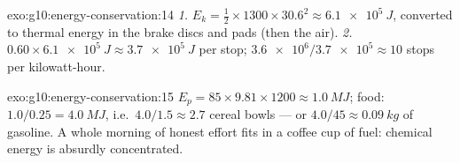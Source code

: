 \begin{solution}{exo:g10:energy-conservation:14}
\emph{1.} $E_k = \tfrac12 \times 1300 \times 30.6^2 \approx
\qty{6.1e5}{J}$, converted to thermal energy in the brake discs
and pads (then the air).
\emph{2.} $0.60 \times \qty{6.1e5}{J} \approx \qty{3.7e5}{J}$ per
stop; $\num{3.6e6}/\num{3.7e5} \approx 10$ stops per kilowatt-hour.
\end{solution}

\begin{solution}{exo:g10:energy-conservation:15}
$E_p = 85 \times 9.81 \times 1200 \approx \qty{1.0}{MJ}$; food:
$1.0/0.25 = \qty{4.0}{MJ}$, i.e.\ $4.0/1.5 \approx 2.7$ cereal
bowls --- or $4.0/45 \approx \qty{0.09}{kg}$ of gasoline. A whole
morning of honest effort fits in a coffee cup of fuel: chemical
energy is absurdly concentrated.
\end{solution}

